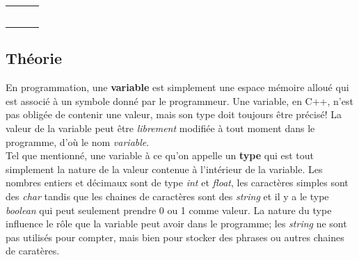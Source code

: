 \documentclass[]{report}
\begin{document}
\begin{adjustwidth}{1.5cm}{0cm}
\vspace{1cm}

\begin{center}
\begin{tabular}{ccc} 
 & & \\  
\\  
 & & \\  
\\  
 & &  \\  
\end{tabular}
\end{center}

\subsection*{\Large{Théorie}}
\vspace{-5mm}\makebox[0.917\textwidth]{\hrulefill}\vspace{3mm}

En programmation, une \textbf{variable} est simplement une espace mémoire alloué qui est associé à un symbole donné par le programmeur. Une variable, en C++, n'est pas obligée de contenir une valeur, mais son type doit toujours être précisé! La valeur de la variable peut être \textit{librement} modifiée à tout moment dans le programme, d'où le nom \textit{variable}.
\\

Tel que mentionné, une variable à ce qu'on appelle un \textbf{type} qui est tout simplement la nature de la valeur contenue à l'intérieur de la variable. Les nombres entiers et décimaux sont de type \textit{int} et \textit{float}, les caractères simples sont des \textit{char} tandis que les chaines de caractères sont des \textit{string} et il y a le type \textit{boolean} qui peut seulement prendre 0 ou 1 comme valeur. La nature du type influence le rôle que la variable peut avoir dans le programme; les \textit{string} ne sont pas utilisés pour compter, mais bien pour stocker des phrases ou autres chaines de caratères.
\\


\end{adjustwidth}
\end{document}
